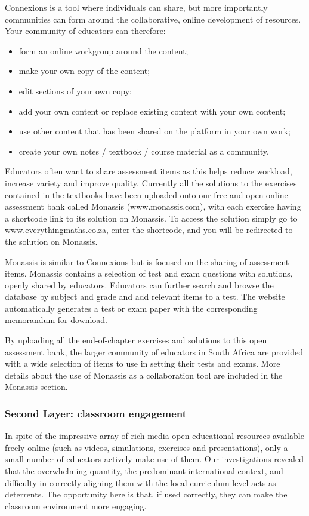 Connexions is a tool where individuals can share, but more importantly communities can form around the collaborative, online development of resources. Your community of educators can therefore:
\begin{itemize}[noitemsep]
\item form an online workgroup around the content;
\item make your own copy of the content;
\item edit sections of your own copy;
\item add your own content or replace existing content with your own content;
\item use other content that has been shared on the platform in your own work;
\item create your own notes / textbook / course material as a community.
\end{itemize}
Educators often want to share assessment items as this helps reduce workload, increase variety and improve quality. Currently all the solutions to the exercises contained in the textbooks have been uploaded onto our free and open online assessment bank called Monassis (www.monassis.com), with each exercise having a shortcode link to its solution on Monassis. To access the solution simply go to \url{www.everythingmaths.co.za},  enter the shortcode, and you will be redirected to the solution on Monassis.\par

Monassis is similar to Connexions but is focused on the sharing of assessment items. Monassis contains a selection of test and exam questions with solutions, openly shared by educators. Educators can further search and browse the database by subject and grade and add relevant items to a test. The website automatically generates a test or exam paper with the corresponding memorandum for download.\par

By uploading all the end-of-chapter exercises and solutions to this open assessment bank, the larger community of educators in South Africa are provided with a wide selection of items to use in setting their tests and exams. More details about the use of Monassis as a collaboration tool are included in the Monassis section.\par

\subsubsection{Second Layer: classroom engagement}
In spite of the impressive array of rich media open educational resources available freely online (such as videos, simulations, exercises and presentations), only a small number of educators actively make use of them. Our investigations revealed that the overwhelming quantity, the predominant international context, and difficulty in correctly aligning them with the local curriculum level acts as deterrents. The opportunity here is that, if used correctly, they can make the classroom environment more engaging.\par

